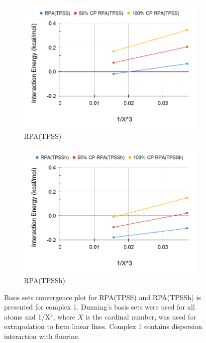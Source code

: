 \documentclass[11pt]{article}
\begin{document}
\begin{figure}[H]
  \centering
  \begin{subfigure}{.5\textwidth}
    \centering
    \includegraphics[scale=0.3]{tpss-1.png}
    \caption{RPA(TPSS)}
    \label{fig:tpss_1}
  \end{subfigure}%
  \begin{subfigure}{.5\textwidth}
    \centering
    \includegraphics[scale=0.3]{tpssh-1.png}
    \caption{RPA(TPSSh)}
    \label{fig:tpssh_1}
  \end{subfigure}
  \caption{Basis sets convergence plot for RPA(TPSS) and RPA(TPSSh) is
    presented for complex 1. Dunning's basis sets were used for all atoms
    and 1/X$^3$, where $X$ is the cardinal number, was used for
    extrapolation to form linear lines. Complex 1 contains dispersion
    interaction with fluorine.}
  \label{fig:complex_1}
\end{figure}
\end{document}
